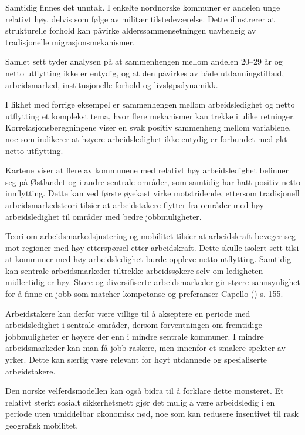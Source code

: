 \documentclass[
  norsk,
  letterpaper,
  DIV=11,
  numbers=noendperiod]{scrartcl}
\begin{document}
Samtidig finnes det unntak. I enkelte nordnorske kommuner er andelen
unge relativt høy, delvis som følge av militær tilstedeværelse. Dette
illustrerer at strukturelle forhold kan påvirke alderssammensetningen
uavhengig av tradisjonelle migrasjonsmekanismer.

Samlet sett tyder analysen på at sammenhengen mellom andelen 20--29 år
og netto utflytting ikke er entydig, og at den påvirkes av både
utdanningstilbud, arbeidsmarked, institusjonelle forhold og
livsløpsdynamikk.

I likhet med forrige eksempel er sammenhengen mellom arbeidsledighet og
netto utflytting et komplekst tema, hvor flere mekanismer kan trekke i
ulike retninger. Korrelasjonsberegningene viser en svak positiv
sammenheng mellom variablene, noe som indikerer at høyere
arbeidsledighet ikke entydig er forbundet med økt netto utflytting.

Kartene viser at flere av kommunene med relativt høy arbeidsledighet
befinner seg på Østlandet og i andre sentrale områder, som samtidig har
hatt positiv netto innflytting. Dette kan ved første øyekast virke
motstridende, ettersom tradisjonell arbeidsmarkedsteori tilsier at
arbeidstakere flytter fra områder med høy arbeidsledighet til områder
med bedre jobbmuligheter.

Teori om arbeidsmarkedsjustering og mobilitet tilsier at arbeidskraft
beveger seg mot regioner med høy etterspørsel etter arbeidskraft. Dette
skulle isolert sett tilsi at kommuner med høy arbeidsledighet burde
oppleve netto utflytting. Samtidig kan sentrale arbeidsmarkeder
tiltrekke arbeidssøkere selv om ledigheten midlertidig er høy. Store og
diversifiserte arbeidsmarkeder gir større sannsynlighet for å finne en
jobb som matcher kompetanse og preferanser Capello
() s. 155.

Arbeidstakere kan derfor være villige til å akseptere en periode med
arbeidsledighet i sentrale områder, dersom forventningen om fremtidige
jobbmuligheter er høyere der enn i mindre sentrale kommuner. I mindre
arbeidsmarkeder kan man få jobb raskere, men innenfor et smalere spekter
av yrker. Dette kan særlig være relevant for høyt utdannede og
spesialiserte arbeidstakere.

Den norske velferdsmodellen kan også bidra til å forklare dette
mønsteret. Et relativt sterkt sosialt sikkerhetsnett gjør det mulig å
være arbeidsledig i en periode uten umiddelbar økonomisk nød, noe som
kan redusere insentivet til rask geografisk mobilitet.
\end{document}

